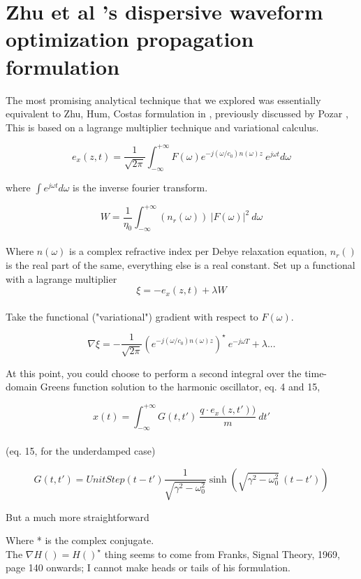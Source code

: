 \documentclass[paper.tex]{subfiles}
\begin{document}
\section{Zhu et al 's dispersive waveform optimization propagation formulation}

The most promising analytical technique that we explored was essentially equivalent to Zhu, Hum, Costas formulation in \cite{Microwave2012b}, previously discussed by Pozar \cite{Waveform2003}, This is based on a lagrange multiplier technique and variational calculus\footnotetext .

$$ e_x(z,t) = \frac{1}{\sqrt{2 \pi}} \int_{-\infty}^{+\infty}{F(\omega) e^{- j (\omega/c_0)n(\omega)z}\ e^{j\omega t} d\omega} $$

where $\int e^{j \omega t} d\omega$ is the inverse fourier transform.

$$W = \frac{1}{\eta_0} \int_{-\infty}^{+\infty}{(n_r(\omega))\ |F(\omega)|^2}\ d\omega$$\\

Where $n(\omega)$ is a complex refractive index per Debye relaxation equation, $n_r()$ is the real part of the same, everything else is a real constant. Set up a functional with a lagrange multiplier\\

$$\xi = -e_x(z,t) + \lambda W$$\\

Take the functional ("variational") gradient with respect to $F(\omega)$.

$$ \nabla \xi = -\frac{1}{\sqrt{2\pi}} \left(e^{- j (\omega/c_0)n(\omega)z}\right)^\star \  e^{-j\omega T} + \lambda...$$

At this point, you could choose to perform a second integral over the time-domain Greens function solution to the harmonic oscillator\cite{Complex2020}, eq. 4 and 15, 

$$x(t) = \int_{-\infty}^{+\infty}{G(t,t')\ \frac{q\cdot e_x(z,t'))}{m}\ } dt'$$\\

(eq. 15, for the underdamped case)

$$G(t,t') = UnitStep(t-t') \frac{1}{\sqrt{\gamma^2-\omega_0^2}  }\sinh\left({\sqrt{\gamma^2-\omega_0^2}}\ (t-t')\right)$$

But a much more straightforward 

Where * is the complex conjugate.\\

The $\nabla H() = H()^\star$ thing seems to come from Franks, Signal Theory, 1969, page 140 onwards; I cannot make heads or tails of his formulation.
\end{document}
